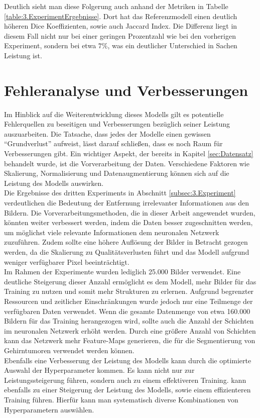 Deutlich sieht man diese Folgerung auch anhand der Metriken in Tabelle \ref{table:3.ExperimentErgebnisse}. Dort hat das Referenzmodell einen deutlich höheren Dice Koeffizienten, sowie auch Jaccard Index. Die Differenz liegt in diesem Fall nicht nur bei einer geringen Prozentzahl wie bei den vorherigen Experiment, sondern bei etwa $7\%$, was ein deutlicher Unterschied in Sachen Leistung ist.


\section{Fehleranalyse und Verbesserungen}
Im Hinblick auf die Weiterentwicklung dieses Modells gilt es potentielle Fehlerquellen zu beseitigen und Verbesserungen bezüglich seiner Leistung auszuarbeiten. Die Tatsache, dass jedes der Modelle einen gewissen ``Grundverlust'' aufweist, lässt darauf schließen, dass es noch Raum für Verbesserungen gibt. Ein wichtiger Aspekt, der bereits in Kapitel \ref{sec:Datensatz} behandelt wurde, ist die Vorverarbeitung der Daten. Verschiedene Faktoren wie Skalierung, Normalisierung und Datenaugmentierung können sich auf die Leistung des Modells auswirken.\\
Die Ergebnisse des dritten Experiments in Abschnitt \ref{subsec:3.Experiment} verdeutlichen die Bedeutung der Entfernung irrelevanter Informationen aus den Bildern. Die Vorverarbeitungsmethoden, die in dieser Arbeit angewendet wurden, könnten weiter verbessert werden, indem die Daten besser zugeschnitten werden, um möglichst viele relevante Informationen dem neuronalen Netzwerk zuzuführen. Zudem sollte eine höhere Auflösung der Bilder in Betracht gezogen werden, da die Skalierung zu Qualitätsverlusten führt und das Modell aufgrund weniger verfügbarer Pixel beeinträchtigt.\\
Im Rahmen der Experimente wurden lediglich 25.000 Bilder verwendet. Eine deutliche Steigerung dieser Anzahl ermöglicht es dem Modell, mehr Bilder für das Training zu nutzen und somit mehr Strukturen zu erlernen. Aufgrund begrenzter Ressourcen und zeitlicher Einschränkungen wurde jedoch nur eine Teilmenge der verfügbaren Daten verwendet. Wenn die gesamte Datenmenge von etwa 160.000 Bildern für das Training herangezogen wird, sollte auch die Anzahl der Schichten im neuronalen Netzwerk erhöht werden. Durch eine größere Anzahl von Schichten kann das Netzwerk mehr Feature-Maps generieren, die für die Segmentierung von Gehirntumoren verwendet werden können. \cite[vgl.][]{Teoh2023}\\
Ebenfalls eine Verbesserung der Leistung des Modells kann durch die optimierte Auswahl der Hyperparameter kommen. Es kann nicht nur zur Leistungssteigerung führen, sondern auch zu einem effektiveren Training. kann ebenfalls zu einer Steigerung der Leistung des Modells, sowie einem effizienteren Training führen. Hierfür kann man systematisch diverse Kombinationen von Hyperparametern auswählen. 


